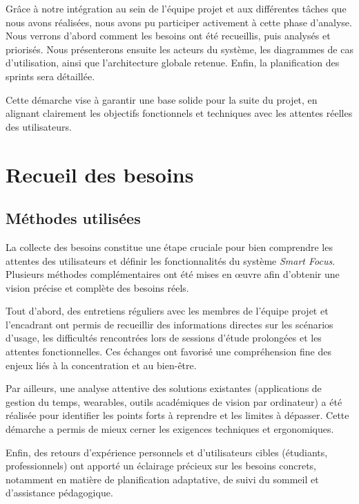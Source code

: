 \documentclass[12pt,a4paper]{report}
\begin{document}
Grâce à notre intégration au sein de l'équipe projet et aux différentes tâches que nous avons réalisées, nous avons pu participer activement à cette phase d'analyse. Nous verrons d'abord comment les besoins ont été recueillis, puis analysés et priorisés. Nous présenterons ensuite les acteurs du système, les diagrammes de cas d'utilisation, ainsi que l'architecture globale retenue. Enfin, la planification des sprints sera détaillée.

Cette démarche vise à garantir une base solide pour la suite du projet, en alignant clairement les objectifs fonctionnels et techniques avec les attentes réelles des utilisateurs.

\section{Recueil des besoins}

\subsection{Méthodes utilisées}

La collecte des besoins constitue une étape cruciale pour bien comprendre les attentes des utilisateurs et définir les fonctionnalités du système \textit{Smart Focus}. Plusieurs méthodes complémentaires ont été mises en œuvre afin d'obtenir une vision précise et complète des besoins réels.

Tout d'abord, des entretiens réguliers avec les membres de l'équipe projet et l'encadrant ont permis de recueillir des informations directes sur les scénarios d'usage, les difficultés rencontrées lors de sessions d'étude prolongées et les attentes fonctionnelles. Ces échanges ont favorisé une compréhension fine des enjeux liés à la concentration et au bien-être.

Par ailleurs, une analyse attentive des solutions existantes (applications de gestion du temps, wearables, outils académiques de vision par ordinateur) a été réalisée pour identifier les points forts à reprendre et les limites à dépasser. Cette démarche a permis de mieux cerner les exigences techniques et ergonomiques.

Enfin, des retours d'expérience personnels et d'utilisateurs cibles (étudiants, professionnels) ont apporté un éclairage précieux sur les besoins concrets, notamment en matière de planification adaptative, de suivi du sommeil et d'assistance pédagogique.
\end{document}
